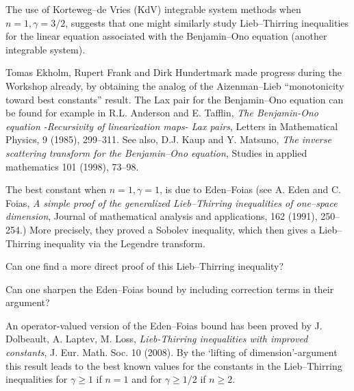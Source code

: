 \documentclass[12pt,letterpaper, reqno]{aimpl}
\begin{document}
\begin{problemblock}


\begin{problem}[2.23]
  The use of Korteweg--de Vries
(KdV) integrable system methods when $n=1, \gamma=3/2$, suggests
that one might similarly study Lieb--Thirring inequalities for the
linear equation associated with the Benjamin--Ono equation (another
integrable system).
\end{problem}

Tomas Ekholm, Rupert Frank and Dirk Hundertmark
made progress during the Workshop already, by obtaining the analog
of the Aizenman--Lieb ``monotonicity toward best constants'' result.
The Lax pair for the Benjamin--Ono equation can be found for example
in R.L. Anderson and E. Tafflin, \emph{The Benjamin-Ono equation
-Recursivity of linearization maps- Lax pairs},
Letters in Mathematical Physics, 9 (1985), 299--311. See also,
D.J. Kaup and Y. Matsuno, \emph{The inverse scattering transform
for the Benjamin--Ono equation},
Studies in applied mathematics 101 (1998), 73--98.

\end{problemblock}

\begin{problemblock}
The best constant when $n=1,
\gamma=1$, is due to Eden--Foias
(see A. Eden and C. Foias, \emph{A simple proof of the
generalized Lieb--Thirring inequalities of one--space dimension},
Journal of mathematical analysis and applications, 162 (1991), 250--254.)
More precisely, they proved a Sobolev inequality, which then gives a
Lieb--Thirring inequality via the Legendre transform.

\begin{problem}[2.26]
Can one find a more direct proof of this Lieb--Thirring
inequality?
\end{problem}
\end{problemblock}

\begin{problemblock}
\begin{problem}[2.3]
Can one sharpen the Eden--Foias bound by including correction terms in their argument?
\end{problem}

\begin{remark}
 An operator-valued version of the Eden--Foias bound
has been proved by J. Dolbeault, A. Laptev, M. Loss, \emph{Lieb-Thirring
inequalities with improved constants}, J. Eur. Math. Soc. 10 (2008). By
the `lifting of dimension'-argument this result leads to the best
known values for the constants in the Lieb--Thirring inequalities for
$\gamma\geq 1$ if $n=1$ and for $\gamma\geq 1/2$ if $n\geq 2$.
\end{remark}

\end{problemblock}
\end{document}
